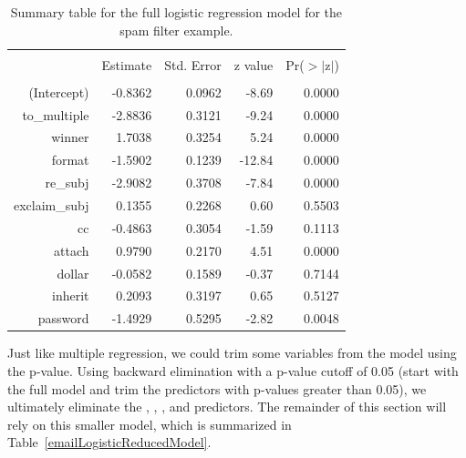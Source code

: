 \begin{table}[ht]
\centering
\begin{tabular}{rrrrr}
  \hline
  \vspace{-3.7mm} & & & & \\
 & Estimate & Std. Error & z value & Pr($>$$|$z$|$) \\ 
  \hline
  \vspace{-3.8mm} & & & & \\
(Intercept) & -0.8362 & 0.0962 & -8.69 & 0.0000 \\ 
  to\_\hspace{0.3mm}multiple & -2.8836 & 0.3121 & -9.24 & 0.0000 \\ 
  winner & 1.7038 & 0.3254 & 5.24 & 0.0000 \\ 
  format & -1.5902 & 0.1239 & -12.84 & 0.0000 \\ 
  re\_\hspace{0.3mm}subj & -2.9082 & 0.3708 & -7.84 & 0.0000 \\ 
  exclaim\_\hspace{0.3mm}subj & 0.1355 & 0.2268 & 0.60 & 0.5503 \\ 
  cc & -0.4863 & 0.3054 & -1.59 & 0.1113 \\ 
  attach & 0.9790 & 0.2170 & 4.51 & 0.0000 \\ 
  dollar & -0.0582 & 0.1589 & -0.37 & 0.7144 \\ 
  inherit & 0.2093 & 0.3197 & 0.65 & 0.5127 \\ 
  password & -1.4929 & 0.5295 & -2.82 & 0.0048 \\ 
\hline
\end{tabular}
\caption{Summary table for the full logistic regression model for the spam filter example.}
\label{emailLogisticModelResults}
\end{table}

Just like multiple regression, we could trim some variables from the model using the p-value. Using backward elimination with a p-value cutoff of 0.05 (start with the full model and trim the predictors with p-values greater than 0.05), we ultimately eliminate the , , , and  predictors. The remainder of this section will rely on this smaller model, which is summarized in Table~\ref{emailLogisticReducedModel}.


